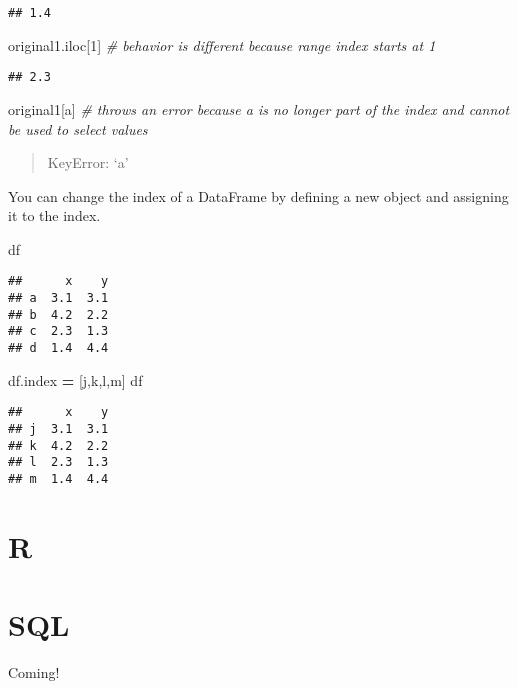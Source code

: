 \documentclass[
]{book}
\newenvironment{Shaded}{\begin{snugshade}}{\end{snugshade}}
\newcommand{\CommentTok}[1]{\textcolor[rgb]{0.56,0.35,0.01}{\textit{#1}}}
\newcommand{\DecValTok}[1]{\textcolor[rgb]{0.00,0.00,0.81}{#1}}
\newcommand{\NormalTok}[1]{#1}
\newcommand{\OperatorTok}[1]{\textcolor[rgb]{0.81,0.36,0.00}{\textbf{#1}}}
\newcommand{\StringTok}[1]{\textcolor[rgb]{0.31,0.60,0.02}{#1}}
\begin{document}
\begin{verbatim}
## 1.4
\end{verbatim}

\begin{Shaded}
\begin{Highlighting}[]
\NormalTok{original1.iloc[}\DecValTok{1}\NormalTok{] }\CommentTok{\# behavior is different because range index starts at 1}
\end{Highlighting}
\end{Shaded}

\begin{verbatim}
## 2.3
\end{verbatim}

\begin{Shaded}
\begin{Highlighting}[]
\NormalTok{original1[}\StringTok{\textquotesingle{}a\textquotesingle{}}\NormalTok{] }\CommentTok{\# throws an error because \textquotesingle{}a\textquotesingle{} is no longer part of the index and cannot be used to select values}
\end{Highlighting}
\end{Shaded}

\begin{quote}
KeyError: `a'
\end{quote}

You can change the index of a DataFrame by defining a new object and assigning it to the index.

\begin{Shaded}
\begin{Highlighting}[]
\NormalTok{df}
\end{Highlighting}
\end{Shaded}

\begin{verbatim}
##      x    y
## a  3.1  3.1
## b  4.2  2.2
## c  2.3  1.3
## d  1.4  4.4
\end{verbatim}

\begin{Shaded}
\begin{Highlighting}[]
\NormalTok{df.index }\OperatorTok{=}\NormalTok{ [}\StringTok{\textquotesingle{}j\textquotesingle{}}\NormalTok{,}\StringTok{\textquotesingle{}k\textquotesingle{}}\NormalTok{,}\StringTok{\textquotesingle{}l\textquotesingle{}}\NormalTok{,}\StringTok{\textquotesingle{}m\textquotesingle{}}\NormalTok{]}
\NormalTok{df}
\end{Highlighting}
\end{Shaded}

\begin{verbatim}
##      x    y
## j  3.1  3.1
## k  4.2  2.2
## l  2.3  1.3
## m  1.4  4.4
\end{verbatim}

\hypertarget{r}{%
\chapter{R}\label{r}}

\hypertarget{sql}{%
\chapter{SQL}\label{sql}}

Coming!

  
\end{document}

